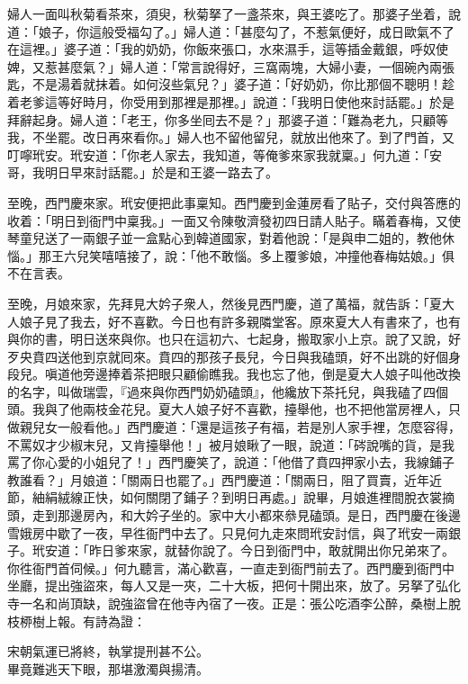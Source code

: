 婦人一面叫秋菊看茶來，須臾，秋菊拏了一盞茶來，與王婆吃了。那婆子坐着，說道：「娘子，你這般受福勾了。」{}婦人道：「甚麼勾了，不惹氣便好，成日歐氣不了在這裡。」婆子道：「我的奶奶，你飯來張口，水來濕手，這等插金戴銀，呼奴使婢，又惹甚麼氣？」婦人道：「常言說得好，三窩兩塊，大婦小妻，一個碗內兩張匙，不是湯着就抹着。如何沒些氣兒？」婆子道：「好奶奶，你比那個不聰明！趁着老爹這等好時月，你受用到那裡是那裡。」說道：「我明日使他來討話罷。」於是拜辭起身。婦人道：「老王，你多坐囘去不是？」那婆子道：「難為老九，只顧等我，不坐罷。改日再來看你。」婦人也不留他留兒，就放出他來了。到了門首，又叮嚀玳安。玳安道：「你老人家去，我知道，等俺爹來家我就稟。」何九道：「安哥，我明日早來討話罷。」於是和王婆一路去了。

至晚，西門慶來家。玳安便把此事稟知。西門慶到金蓮房看了貼子，交付與答應的收着：「明日到衙門中稟我。」一面又令陳敬濟發初四日請人貼子。瞞着春梅，又使琴童兒送了一兩銀子並一盒點心到韓道國家，對着他說：「是與申二姐的，教他休惱。」那王六兒笑嘻嘻接了，說：「他不敢惱。多上覆爹娘，冲撞他春梅姑娘。」俱不在言表。

至晚，月娘來家，先拜見大妗子衆人，然後見西門慶，道了萬福，就告訴：「夏大人娘子見了我去，好不喜歡。今日也有許多親隣堂客。原來夏大人有書來了，也有與你的書，明日送來與你。{}也只在這初六、七起身，搬取家小上京。說了又說，好歹央賁四送他到京就囘來。賁四的那孩子長兒，今日與我磕頭，好不出跳的好個身段兒。嗔道他旁邊捧着茶把眼只顧偷瞧我。我也忘了他，倒是夏大人娘子叫他改換的名字，叫做瑞雲，『過來與你西門奶奶磕頭』，他纔放下茶托兒，與我磕了四個頭。我與了他兩枝金花兒。夏大人娘子好不喜歡，擡舉他，也不把他當房裡人，只做親兒女一般看他。」西門慶道：「還是這孩子有福，若是別人家手裡，怎麼容得，不罵奴才少椒末兒，又肯擡舉他！」{}被月娘瞅了一眼，說道：「硶說嘴的貨，是我罵了你心愛的小姐兒了！」西門慶笑了，說道：「他借了賁四押家小去，我線鋪子教誰看？」月娘道：「關兩日也罷了。」西門慶道：「關兩日，阻了買賣，近年近節，紬絹絨線正快，如何關閉了鋪子？到明日再處。」說畢，月娘進裡間脫衣裳摘頭，走到那邊房內，和大妗子坐的。家中大小都來叅見磕頭。是日，西門慶在後邊雪娥房中歇了一夜，早徃衙門中去了。只見何九走來問玳安討信，與了玳安一兩銀子。玳安道：「昨日爹來家，就替你說了。今日到衙門中，敢就開出你兄弟來了。你徃衙門首伺候。」何九聽言，滿心歡喜，一直走到衙門前去了。西門慶到衙門中坐廳，提出強盜來，每人又是一夾，二十大板，把何十開出來，放了。另拏了弘化寺一名和尚頂缺，說強盜曾在他寺內宿了一夜。{}正是：張公吃酒李公醉，桑樹上脫枝桺樹上報。有詩為證：

\begin{myquote} 
宋朝氣運已將終，執掌提刑甚不公。\\畢竟難逃天下眼，那堪激濁與揚清。
\end{myquote} 

